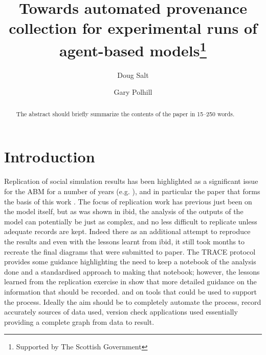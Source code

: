 \documentclass[runningheads]{llncs}
\begin{document}
%
\title{Towards automated provenance collection for experimental runs of agent-based models\thanks{Supported by The Scottish Government}}
%
%
\author{Doug Salt \and
Gary Polhill }
%
%
%
\maketitle              %
%
\begin{abstract}
The abstract should briefly summarize the contents of the paper in
15--250 words.

\end{abstract}
%
%
%
\section{Introduction}

Replication of social simulation results has been highlighted as a significant
issue for the ABM for a number of years (e.g.  \cite{edmonds2003replication}),
and in particular the paper that forms the basis of this work
\cite{polhill2017lessons}.  The focus of replication work has previous just
been on the model itself, but as was shown in ibid, the analysis of the
outputs of the model can potentially be just as complex, and no less difficult
to replicate unless adequate records are kept. Indeed there as an additional
attempt to reproduce the results and even with the lessons learnt from ibid, it
still took months to recreate the final diagrams that were submitted to paper.
The TRACE protocol \cite{schmolke2010ecological,ayllon2021keeping} provides
some guidance highlighting the need to keep a notebook of the analysis done and
a standardised approach to making that notebook; however, the lessons learned
from the replication exercise in \cite{polhill2017lessons} show that more
detailed guidance on the information that should be recorded.  and on tools
that could be used to support the process. Ideally the aim should be to
completely automate the process, record accurately sources of data used,
version check applications used essentially providing a complete graph from
data to result.
\end{document}
